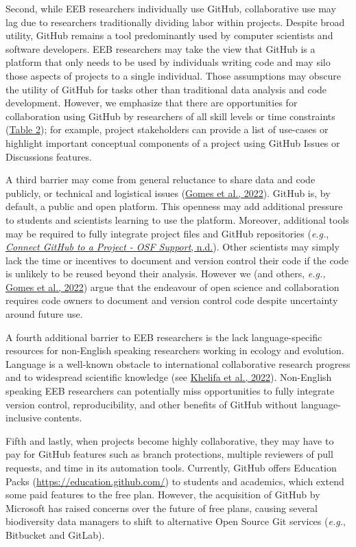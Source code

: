 Second, while EEB researchers individually use GitHub, collaborative use may lag due to researchers traditionally dividing labor within projects.
Despite broad utility, GitHub remains a tool predominantly used by computer scientists and software developers.
EEB researchers may take the view that GitHub is a platform that only needs to be used by individuals writing code and may silo those aspects of projects to a single individual.
Those assumptions may obscure the utility of GitHub for tasks other than traditional data analysis and code development.
However, we emphasize that there are opportunities for collaboration using GitHub by researchers of all skill levels or time constraints (\protect\hyperlink{tbl:roles}{Table 2}); for example, project stakeholders can provide a list of use-cases or highlight important conceptual components of a project using GitHub Issues or Discussions features.

A third barrier may come from general reluctance to share data and code publicly, or technical and logistical issues (\protect\hyperlink{ref-VDJput1V}{Gomes et al., 2022}).
GitHub is, by default, a public and open platform.
This openness may add additional pressure to students and scientists learning to use the platform.
Moreover, additional tools may be required to fully integrate project files and GitHub repositories (\emph{e.g.}, \protect\hyperlink{ref-lx49NGto}{\emph{Connect GitHub to a Project - OSF Support}, n.d.}).
Other scientists may simply lack the time or incentives to document and version control their code if the code is unlikely to be reused beyond their analysis.
However we (and others, \emph{e.g.,} \protect\hyperlink{ref-VDJput1V}{Gomes et al., 2022}) argue that the endeavour of open science and collaboration requires code owners to document and version control code despite uncertainty around future use.

A fourth additional barrier to EEB researchers is the lack language-specific resources for non-English speaking researchers working in ecology and evolution.
Language is a well-known obstacle to international collaborative research progress and to widespread scientific knowledge (see \protect\hyperlink{ref-cW7vGddM}{Khelifa et al., 2022}).
Non-English speaking EEB researchers can potentially miss opportunities to fully integrate version control, reproducibility, and other benefits of GitHub without language-inclusive contents.

Fifth and lastly, when projects become highly collaborative, they may have to pay for GitHub features such as branch protections, multiple reviewers of pull requests, and time in its automation tools.
Currently, GitHub offers Education Packs (\url{https://education.github.com/}) to students and academics, which extend some paid features to the free plan.
However, the acquisition of GitHub by Microsoft has raised concerns over the future of free plans, causing several biodiversity data managers to shift to alternative Open Source Git services (\emph{e.g.}, Bitbucket and GitLab).

